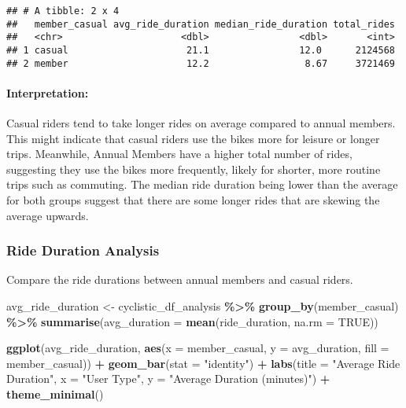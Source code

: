 \documentclass[
]{article}
\newenvironment{Shaded}{\begin{snugshade}}{\end{snugshade}}
\newcommand{\AttributeTok}[1]{\textcolor[rgb]{0.13,0.29,0.53}{#1}}
\newcommand{\ConstantTok}[1]{\textcolor[rgb]{0.56,0.35,0.01}{#1}}
\newcommand{\FunctionTok}[1]{\textcolor[rgb]{0.13,0.29,0.53}{\textbf{#1}}}
\newcommand{\NormalTok}[1]{#1}
\newcommand{\OtherTok}[1]{\textcolor[rgb]{0.56,0.35,0.01}{#1}}
\newcommand{\SpecialCharTok}[1]{\textcolor[rgb]{0.81,0.36,0.00}{\textbf{#1}}}
\newcommand{\StringTok}[1]{\textcolor[rgb]{0.31,0.60,0.02}{#1}}
\begin{document}
\begin{verbatim}
## # A tibble: 2 x 4
##   member_casual avg_ride_duration median_ride_duration total_rides
##   <chr>                     <dbl>                <dbl>       <int>
## 1 casual                     21.1                12.0      2124568
## 2 member                     12.2                 8.67     3721469
\end{verbatim}

\paragraph{Interpretation:}\label{interpretation}

Casual riders tend to take longer rides on average compared to annual
members. This might indicate that casual riders use the bikes more for
leisure or longer trips. Meanwhile, Annual Members have a higher total
number of rides, suggesting they use the bikes more frequently, likely
for shorter, more routine trips such as commuting. The median ride
duration being lower than the average for both groups suggest that there
are some longer rides that are skewing the average upwards.

\subsubsection{Ride Duration Analysis}\label{ride-duration-analysis}

Compare the ride durations between annual members and casual riders.

\begin{Shaded}
\begin{Highlighting}[]
\NormalTok{avg\_ride\_duration }\OtherTok{\textless{}{-}}\NormalTok{ cyclistic\_df\_analysis }\SpecialCharTok{\%\textgreater{}\%}
  \FunctionTok{group\_by}\NormalTok{(member\_casual) }\SpecialCharTok{\%\textgreater{}\%}
  \FunctionTok{summarise}\NormalTok{(}\AttributeTok{avg\_duration =} \FunctionTok{mean}\NormalTok{(ride\_duration, }\AttributeTok{na.rm =} \ConstantTok{TRUE}\NormalTok{))}

\FunctionTok{ggplot}\NormalTok{(avg\_ride\_duration, }\FunctionTok{aes}\NormalTok{(}\AttributeTok{x =}\NormalTok{ member\_casual, }\AttributeTok{y =}\NormalTok{ avg\_duration, }\AttributeTok{fill =}\NormalTok{ member\_casual)) }\SpecialCharTok{+}
  \FunctionTok{geom\_bar}\NormalTok{(}\AttributeTok{stat =} \StringTok{"identity"}\NormalTok{) }\SpecialCharTok{+}
  \FunctionTok{labs}\NormalTok{(}\AttributeTok{title =} \StringTok{"Average Ride Duration"}\NormalTok{, }\AttributeTok{x =} \StringTok{"User Type"}\NormalTok{, }\AttributeTok{y =} \StringTok{"Average Duration (minutes)"}\NormalTok{) }\SpecialCharTok{+}
  \FunctionTok{theme\_minimal}\NormalTok{()}
\end{Highlighting}
\end{Shaded}
\end{document}
